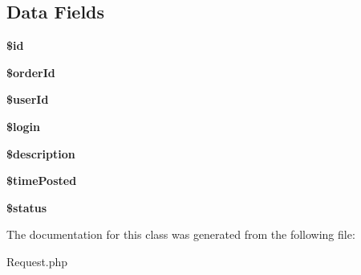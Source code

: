 \subsection*{Data Fields}
\begin{DoxyCompactItemize}
\item 
\hypertarget{classapp_1_1models_1_1_request_ae97941710d863131c700f069b109991e}{}\label{classapp_1_1models_1_1_request_ae97941710d863131c700f069b109991e} 
{\bfseries \$id}
\item 
\hypertarget{classapp_1_1models_1_1_request_a2b632c2ffbf6f86208b22492b86fa1c1}{}\label{classapp_1_1models_1_1_request_a2b632c2ffbf6f86208b22492b86fa1c1} 
{\bfseries \$order\+Id}
\item 
\hypertarget{classapp_1_1models_1_1_request_a84651f4070d04080f6c5fd3c98cc9104}{}\label{classapp_1_1models_1_1_request_a84651f4070d04080f6c5fd3c98cc9104} 
{\bfseries \$user\+Id}
\item 
\hypertarget{classapp_1_1models_1_1_request_afc31993e855f9631572adfedcfe6f34b}{}\label{classapp_1_1models_1_1_request_afc31993e855f9631572adfedcfe6f34b} 
{\bfseries \$login}
\item 
\hypertarget{classapp_1_1models_1_1_request_a87b032cba06009e3467abf1c8018d960}{}\label{classapp_1_1models_1_1_request_a87b032cba06009e3467abf1c8018d960} 
{\bfseries \$description}
\item 
\hypertarget{classapp_1_1models_1_1_request_a01cea456eabd700254653d5b8dcaba9d}{}\label{classapp_1_1models_1_1_request_a01cea456eabd700254653d5b8dcaba9d} 
{\bfseries \$time\+Posted}
\item 
\hypertarget{classapp_1_1models_1_1_request_a58391ea75f2d29d5d708d7050b641c33}{}\label{classapp_1_1models_1_1_request_a58391ea75f2d29d5d708d7050b641c33} 
{\bfseries \$status}
\end{DoxyCompactItemize}


The documentation for this class was generated from the following file\+:\begin{DoxyCompactItemize}
\item 
Request.\+php\end{DoxyCompactItemize}
